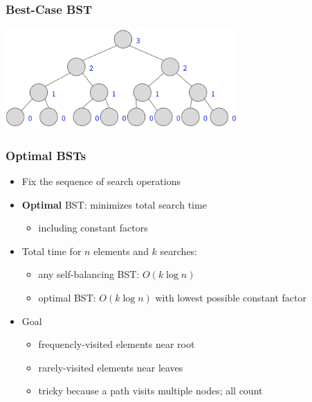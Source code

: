 \documentclass[10pt,aspectratio=169]{beamer}
\begin{document}
\begin{frame} \frametitle{Best-Case BST}
  \begin{center}
    \includegraphics[height=1.5in]{bst_balanced.png}
  \end{center}
\end{frame}

\begin{frame} \frametitle{Optimal BSTs}
  \begin{itemize}
    \item Fix the sequence of search operations
    \item \textbf{Optimal} BST: minimizes total search time
      \begin{itemize}
        \item including constant factors
      \end{itemize}
    \item Total time for $n$ elements and $k$ searches:
      \begin{itemize}
        \item any self-balancing BST: $O(k \log n)$
        \item optimal BST: $O(k \log n)$ with lowest possible constant factor
      \end{itemize}
    \item Goal
      \begin{itemize}
        \item frequencly-visited elements near root
        \item rarely-visited elements near leaves
        \item tricky because a path visits multiple nodes; all count
      \end{itemize}
  \end{itemize}
\end{frame}
\end{document}
